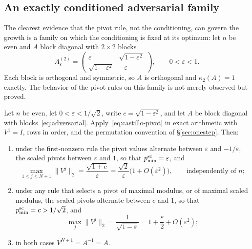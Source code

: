 \documentclass[review,onefignum,onetabnum]{siamart251216}
\begin{document}
\subsection{An exactly conditioned adversarial family}
\label{sec:adversarial}

The clearest evidence that the pivot rule, not the conditioning, can govern the growth is a
family on which the conditioning is fixed at its optimum: let $n$ be even and $A$ block diagonal
with $2\times2$ blocks
%
\begin{equation}\label{eq:adversarial}
A_\varepsilon^{(2)} =
\begin{pmatrix}
\varepsilon & \sqrt{1-\varepsilon^2}\\[2pt]
\sqrt{1-\varepsilon^2} & -\varepsilon
\end{pmatrix},
\qquad 0<\varepsilon<1 .
\end{equation}
%
Each block is orthogonal and symmetric, so $A$ is orthogonal and $\kappa_2(A)=1$ exactly.
The behavior of the pivot rules on this family is not merely observed but proved.

\begin{proposition}\label{prop:adversarial}
Let $n$ be even, let $0<\varepsilon<1/\sqrt2$, write $c=\sqrt{1-\varepsilon^2}$, and let $A$
be block diagonal with blocks~\eqref{eq:adversarial}. Apply~\eqref{eq:castillo-pivot} in
exact arithmetic with $V^1=I$, rows in order, and the permutation convention of
\S\ref{sec:onestep}. Then:
\begin{enumerate}
\item under the first-nonzero rule the pivot values alternate between $\varepsilon$ and
$-1/\varepsilon$, the scaled pivots between $\varepsilon$ and $1$, so that
$p^{\rm sc}_{\min}=\varepsilon$, and
\[
\max_{1\le j\le N+1}\|V^j\|_2
= \frac{\sqrt{1+c}}{\varepsilon}
= \frac{\sqrt2}{\varepsilon}\bigl(1+O(\varepsilon^2)\bigr),
\qquad\text{independently of }n;
\]
\item under any rule that selects a pivot of maximal modulus, or of maximal scaled modulus,
the scaled pivots alternate between $c$ and $1$, so that $p^{\rm sc}_{\min}=c>1/\sqrt2$, and
\[
\max_j\|V^j\|_2
=\frac{1}{\sqrt{1-\varepsilon}}
=1+\frac{\varepsilon}{2}+O(\varepsilon^2);
\]
\item in both cases $V^{N+1}=A^{-1}=A$.
\end{enumerate}
\end{proposition}
\end{document}
